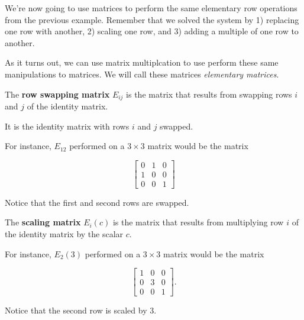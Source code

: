 \documentclass{ximera}
\begin{document}
\begin{remark}

  We're now going to use matrices to perform the same elementary row operations from the previous example. Remember that we solved the system by 1) replacing one row with another, 2) scaling one row, and 3) adding a multiple of one row to another.

  As it turns out, we can use matrix multiplcation to use perform these same manipulations to matrices. We will call these matrices \emph{elementary matrices}.

\end{remark}

  \begin{definition}
    The \textbf{row swapping matrix} $E_{ij}$ is the matrix that results from swapping rows $i$ and $j$ of the identity matrix.

    It is the identity matrix with rows $i$ and $j$ swapped.

    For instance, $E_{12}$ performed on a $3\times 3$ matrix would be the matrix

    \begin{equation*}
      \begin{bmatrix}
        0 & 1 & 0 \\
        1 & 0 & 0 \\
        0 & 0 & 1
      \end{bmatrix}
    \end{equation*}

    Notice that the first and second rows are swapped.
  \end{definition}

  \begin{definition}
    The \textbf{scaling matrix} $E_{i}(c)$ is the matrix that results from multiplying row $i$ of the identity matrix by the scalar $c$.

    For instance, $E_{2}(3)$ performed on a $3\times 3$ matrix would be the matrix

    \begin{equation*}
      \begin{bmatrix}
        1 & 0 & 0 \\
        0 & 3 & 0 \\
        0 & 0 & 1
      \end{bmatrix}.
    \end{equation*}

    Notice that the second row is scaled by $3$.
  \end{definition}
\end{document}
